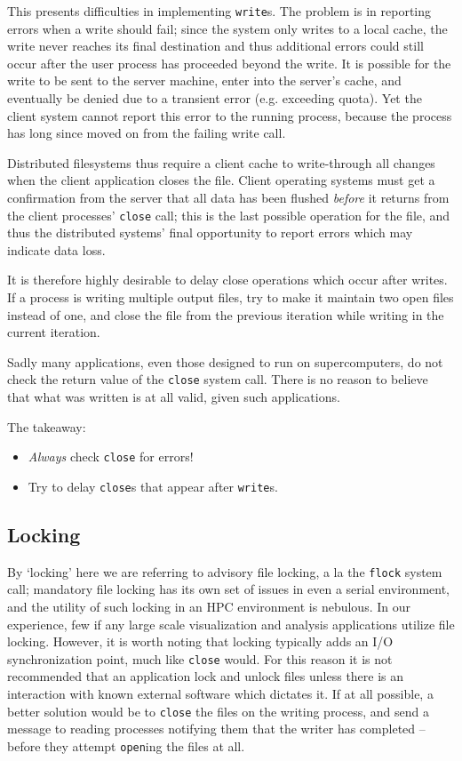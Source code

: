 This presents difficulties in implementing \verb!write!s.  The problem
is in reporting errors when a write should fail; since the system only
writes to a local cache, the write never reaches its final destination
and thus additional errors could still occur after the user process has
proceeded beyond the write.  It is possible for the write to be sent to
the server machine, enter into the server's cache, and eventually be
denied due to a transient error (e.g. exceeding quota).  Yet the client
system cannot report this error to the running process, because the
process has long since moved on from the failing write call.

Distributed filesystems thus require a client cache to write-through
all changes when the client application closes the file.  Client
operating systems must get a confirmation from the server that all data
has been flushed
\emph{before} it returns from the client processes' \verb!close!
call; this is the last possible operation for the file, and thus the
distributed systems' final opportunity to report errors which may
indicate data loss.

It is therefore highly desirable to delay close operations which occur
after writes.  If a process is writing multiple output files, try to
make it maintain two open files instead of one, and close the file from
the previous iteration while writing in the current iteration.

Sadly many applications, even those designed to run on supercomputers,
do not check the return value of the \verb!close! system call.  There
is no reason to believe that what was written is at all valid, given
such applications.

The takeaway:

\begin{itemize}
  \item \emph{Always} check \verb!close! for errors!
  \item Try to delay \verb!close!s that appear after \verb!write!s.
\end{itemize}

\subsection{Locking}

By `locking' here we are referring to advisory file locking, a la
the \verb!flock! system call; mandatory file locking has its own
set of issues in even a serial environment, and the utility of such
locking in an HPC environment is nebulous.  In our experience, few
if any large scale visualization and analysis applications utilize
file locking.  However, it is worth noting that locking typically
adds an I/O synchronization point, much like \verb!close! would.  For
this reason it is not recommended that an application lock and unlock
files unless there is an interaction with known external software
which dictates it.  If at all possible, a better solution would be
to \verb!close! the files on the writing process, and send a message
to reading processes notifying them that the writer has completed --
before they attempt \verb!open!ing the files at all.

